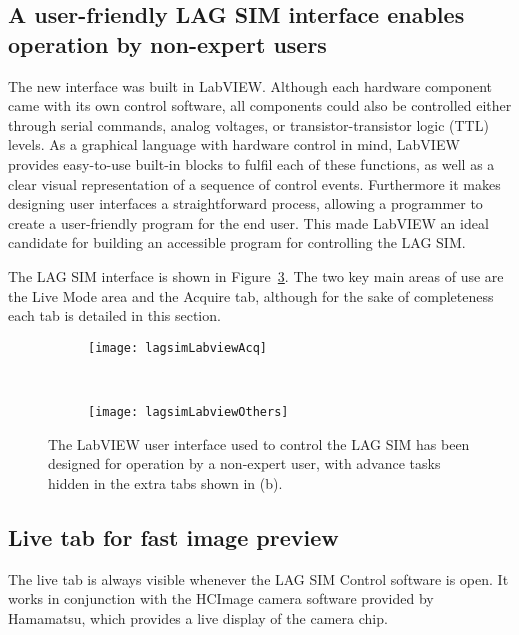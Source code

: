 \subsection{A user-friendly LAG SIM interface enables operation by non-expert users}
The new interface was built in LabVIEW. 
Although each hardware component came with its own control software, all components could also be controlled either through serial commands, analog voltages, or transistor-transistor logic (TTL) levels. 
As a graphical language with hardware control in mind, LabVIEW provides easy-to-use built-in blocks to fulfil each of these functions, as well as a clear visual representation of a sequence of control events.
Furthermore it makes designing user interfaces a straightforward process, allowing a programmer to create a user-friendly program for the end user. 
This made LabVIEW an ideal candidate for building an accessible program for controlling the LAG SIM.

The LAG SIM interface is shown in Figure~\ref{fig:lagsimLabview}.
The two key main areas of use are the Live Mode area and the Acquire tab, although for the sake of completeness each tab is detailed in this section. 

\begin{figure}[p]
\centering
\begin{subfigure}[b]{0.6\textwidth}
	\texttt{[image: lagsimLabviewAcq]}
	\caption{}\label{fig:fpbLabviewAcq}
\end{subfigure}

~\newline
\begin{subfigure}[b]{1.0\textwidth}
	\texttt{[image: lagsimLabviewOthers]}
	\caption{}\label{fig:fpbLabviewTabs}
\end{subfigure}
\caption[LAG SIM: The LabVIEW user interface for controlling LAG SIM is designed for operation by non-expert users]{The LabVIEW user interface used to control the LAG SIM has been designed for operation by a non-expert user, with advance tasks hidden in the extra tabs shown in (b). } %
\label{fig:lagsimLabview}
\end{figure}

\subsection{Live tab for fast image preview} \label{sec:lagsimLive}
The live tab is always visible whenever the LAG SIM Control software is open. 
It works in conjunction with the HCImage camera software provided by Hamamatsu, which provides a live display of the camera chip. 

